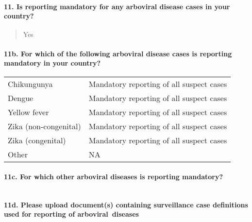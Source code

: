 \documentclass[
]{article}
\begin{document}
\hypertarget{is-reporting-mandatory-for-any-arboviral-disease-cases-in-your-country}{%
\paragraph{11. Is reporting mandatory for any arboviral disease cases in
your
country?}\label{is-reporting-mandatory-for-any-arboviral-disease-cases-in-your-country}}

\begin{quote}
Yes
\end{quote}

\hypertarget{b.-for-which-of-the-following-arboviral-disease-cases-is-reporting-mandatory-in-your-country}{%
\paragraph{11b. For which of the following arboviral disease cases is
reporting mandatory in your
country?}\label{b.-for-which-of-the-following-arboviral-disease-cases-is-reporting-mandatory-in-your-country}}

\begin{longtable}[]{@{}ll@{}}
\toprule
\endhead
Chikungunya & Mandatory reporting of all suspect cases \\
Dengue & Mandatory reporting of all suspect cases \\
Yellow fever & Mandatory reporting of all suspect cases \\
Zika (non-congenital) & Mandatory reporting of all suspect cases \\
Zika (congenital) & Mandatory reporting of all suspect cases \\
Other & NA \\
\bottomrule
\end{longtable}

\hypertarget{c.-for-which-other-arboviral-diseases-is-reporting-mandatory}{%
\paragraph{11c. For which other arboviral diseases is reporting
mandatory?}\label{c.-for-which-other-arboviral-diseases-is-reporting-mandatory}}

\begin{longtable}[]{@{}lll@{}}
\toprule
\endhead
\bottomrule
\end{longtable}

\hypertarget{d.-please-upload-documents-containing-surveillance-case-definitions-used-for-reporting-of-arboviral-diseases}{%
\paragraph{11d. Please upload document(s) containing surveillance case
definitions used for reporting of
arboviral~diseases}\label{d.-please-upload-documents-containing-surveillance-case-definitions-used-for-reporting-of-arboviral-diseases}}
\end{document}
